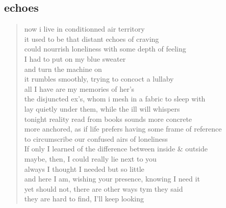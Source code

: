 \documentclass[11pt]{article}
\begin{document}
\subsection{echoes}
\label{sec:org5ef34da}
\begin{verse}
now i live in conditionned air territory\\
it used to be that distant echoes of craving\\
could nourrish loneliness with some depth of feeling\\
I had to put on my blue sweater\\
and turn the machine on\\
\vspace*{1em}
it rumbles smoothly, trying to concoct a lullaby\\
all I have are my memories of her's\\
the disjuncted ex's, whom i mesh in a fabric to sleep with\\
lay quietly under them, while the ill will whispers\\
tonight reality read from books sounds more concrete\\
more anchored, as if life prefers having some frame of reference\\
to circumscribe our confused airs of loneliness\\
\vspace*{1em}
If only I learned of the difference between inside \& outside\\
maybe, then, I could really lie next to you\\
always I thought I needed but so little\\
and here I am, wishing your presence, knowing I need it\\
yet should not, there are other ways tym they said\\
they are hard to find, I'll keep looking\\
\end{verse}
\end{document}
